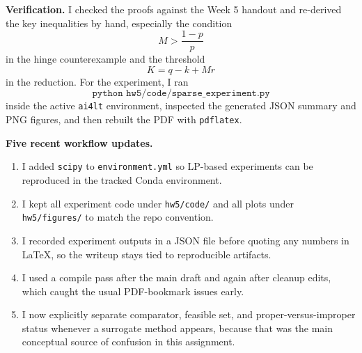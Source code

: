 \documentclass{article}
\begin{document}
\textbf{Verification.}
I checked the proofs against the Week 5 handout and re-derived the key inequalities by hand, especially the condition
$$
M>\frac{1-p}{p}
$$
in the hinge counterexample and the threshold
$$
K=q-k+Mr
$$
in the reduction. For the experiment, I ran
$$
\texttt{python hw5/code/sparse\_experiment.py}
$$
inside the active \texttt{ai4lt} environment, inspected the generated JSON summary and PNG figures, and then rebuilt the PDF with \texttt{pdflatex}.

\textbf{Five recent workflow updates.}
\begin{enumerate}
\item I added \texttt{scipy} to \texttt{environment.yml} so LP-based experiments can be reproduced in the tracked Conda environment.
\item I kept all experiment code under \texttt{hw5/code/} and all plots under \texttt{hw5/figures/} to match the repo convention.
\item I recorded experiment outputs in a JSON file before quoting any numbers in LaTeX, so the writeup stays tied to reproducible artifacts.
\item I used a compile pass after the main draft and again after cleanup edits, which caught the usual PDF-bookmark issues early.
\item I now explicitly separate comparator, feasible set, and proper-versus-improper status whenever a surrogate method appears, because that was the main conceptual source of confusion in this assignment.
\end{enumerate}
\end{document}
